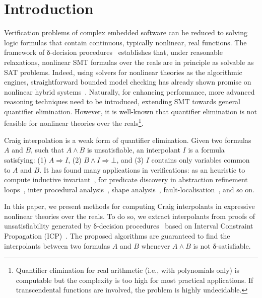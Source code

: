 \section{Introduction}
\label{sec:intro}


Verification problems of complex embedded software can be reduced to solving logic formulas that contain continuous, typically nonlinear, real functions. The framework of δ-decision procedures~\cite{DBLP:conf/lics/GaoAC12,DBLP:conf/fmcad/GaoKC13} establishes that, under reasonable relaxations, nonlinear SMT formulas over the reals are in principle as solvable as SAT problems. Indeed, using solvers for nonlinear theories as the algorithmic engines, straightforward bounded model checking has already shown promise on nonlinear hybrid systems~\cite{DBLP:conf/cav/ChenAS13,DBLP:conf/tacas/KongGCC15}. Naturally, for enhancing performance, more advanced reasoning techniques need to be introduced, extending SMT towards general quantifier elimination. However, it is well-known that quantifier elimination is not feasible for nonlinear theories over the reals\footnote{Quantifier elimination for real arithmetic (i.e., with polynomials only) is computable but the complexity is too high for most practical applications. If transcendental functions are involved, the problem is highly undecidable.}.  

Craig interpolation is a weak form of quantifier elimination.
Given two formulas $A$ and $B$, such that $A ∧ B$ is unsatisfiable, an interpolant $I$ is a formula satisfying: (1) $A ⇒ I$, (2) $B ∧ I ⇒ ⊥$, and (3) $I$ contains only variables common to $A$ and $B$.
It has found many applications in verifications:
as an heuristic to compute inductive invariant~\cite{DBLP:conf/cav/McMillan03,DBLP:conf/vmcai/McMillan07,DBLP:conf/sas/McMillan11},
for predicate discovery in abstraction refinement loops~\cite{DBLP:conf/cav/McMillan06},
inter procedural analysis~\cite{DBLP:conf/vmcai/AlbarghouthiGC12,DBLP:conf/cav/AlbarghouthiLGC12},
shape analysis~\cite{DBLP:conf/esop/AlbarghouthiBCK15},
fault-localisation~\cite{DBLP:conf/fm/ErmisSW12,DBLP:conf/vmcai/ChristESW13,DBLP:conf/sigsoft/SchafSW13}, and so on.

In this paper, we present methods for computing Craig interpolants in expressive nonlinear theories over the reals. To do so, we extract interpolants from proofs of unsatisfiability generated by δ-decision procedures~\cite{DBLP:conf/synasc/GaoKC14} based on Interval Constraint Propagation (ICP)~\cite{handbookICP}. The proposed algorithms are guaranteed to find the interpolants between two formulas $A$ and $B$ whenever $A ∧ B$ is not δ-satisfiable.


